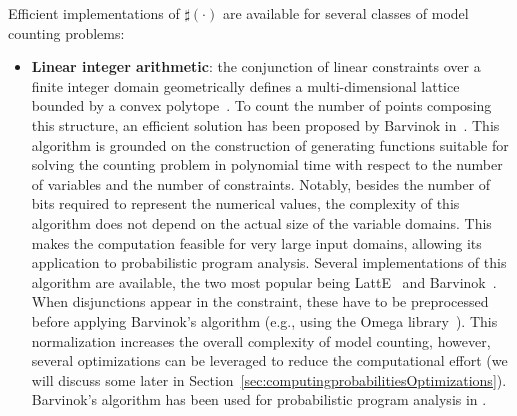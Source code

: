 Efficient implementations of $\sharp(\cdot)$ are available for several classes of model counting problems:

\begin{itemize}
	\item \textbf{Linear integer arithmetic}: the conjunction of linear constraints over a finite integer domain geometrically defines a multi-dimensional lattice bounded by a convex polytope~\cite{de2008computationalGeometry}. To count the number of points composing this structure, an efficient solution has been proposed by Barvinok in~\cite{barvinok1994polynomial}. This algorithm is grounded on the construction of generating functions suitable for solving the counting problem in polynomial time with respect to the number of variables and the number of constraints. Notably, besides the number of bits required to represent the numerical values, the complexity of this algorithm does not depend on the actual size of the variable domains. This makes the computation feasible for very large input domains, allowing its application to probabilistic program analysis. Several implementations of this algorithm are available, the two most popular being LattE~\cite{LattESoftware} and Barvinok~\cite{verdoolaegesoftware}. When disjunctions appear in the constraint, these have to be preprocessed before applying Barvinok's algorithm (e.g., using the Omega library~\cite{Omega1996}). This normalization increases the overall complexity of model counting, however, several optimizations can be leveraged to reduce the computational effort (we will discuss some later in Section~\ref{sec:computingprobabilitiesOptimizations}). Barvinok's algorithm has been used for probabilistic program analysis in \cite{Geldenhuys2012,Filieri2013,Filieri2015}.


\end{itemize}
